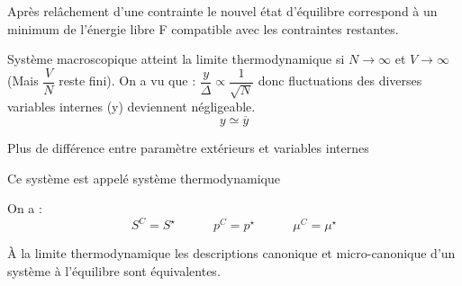 \documentclass[12pt,a4paper]{report}
\begin{document}
Après relâchement d'une contrainte le nouvel état d'équilibre correspond à un minimum de l'énergie libre F compatible avec les contraintes restantes.

Système macroscopique atteint la limite thermodynamique si \( N \rightarrow \infty \) et \( V \rightarrow \infty \) (Mais \(\dfrac{V}{N}\) reste fini).
On a vu que : \( \dfrac{y}{ \Delta} \propto \dfrac{1}{\sqrt{N}} \) donc fluctuations des diverses variables internes (y) deviennent négligeable.
\[
	y \simeq \overline{y} 
\]

Plus de différence entre paramètre extérieurs et variables internes 

Ce système est appelé système thermodynamique

On a :
\[
	S^C = S^\star \quad \quad \quad p^C = p^\star \quad \quad \quad \mu^C = \mu^\star
\]

À la limite thermodynamique les descriptions canonique et micro-canonique d'un système à l'équilibre sont équivalentes.
\end{document}
